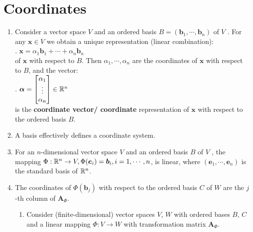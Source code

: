 \section{Coordinates}

\begin{enumerate}
    \item Consider a vector space $V$ and an ordered basis $B = (\bm{b}_1, \cdots , \bm{b}_n)$ of $V$ .
    For any $\bm{x} \in V$ we obtain a unique representation (linear combination):
    \hfill \cite{mfml/book/mml/Deisenroth-Faisal-Ong}
    \\
    .\hfill
    $
        \bm{x} = \alpha_1 \bm{b}_1 + \cdots + \alpha_n \bm{b}_n
    $
    \hfill \cite{mfml/book/mml/Deisenroth-Faisal-Ong}
    \\
    of $\bm{x}$ with respect to $B$.
    Then $\alpha_1, \cdots , \alpha_n$ are the coordinates of $\bm{x}$ with respect to $B$, and the vector:
    \hfill \cite{mfml/book/mml/Deisenroth-Faisal-Ong}
    \\
    .\hfill
    $
        \bm{\alpha} = \begin{bmatrix}
            \alpha_1 \\
            \vdots \\
            \alpha_n
        \end{bmatrix}
        \in \mathbb{R}^n
    $
    \hfill \cite{mfml/book/mml/Deisenroth-Faisal-Ong}
    \\
    is the \textbf{coordinate vector/ coordinate} representation of $\bm{x}$ with respect to the ordered basis $B$.
    \hfill \cite{mfml/book/mml/Deisenroth-Faisal-Ong}

    \item A basis effectively defines a coordinate system.
    \hfill \cite{mfml/book/mml/Deisenroth-Faisal-Ong}

    \item For an $n$-dimensional vector space $V$ and an ordered basis $B$ of $V$ , the mapping $\Phi : \mathbb{R}^n \to V , \Phi(\bm{e}_i) = \bm{b}_i , i = 1, \cdots , n$, is linear, where $(\bm{e}_1, \cdots , \bm{e}_n)$ is the standard basis of $\mathbb{R}^n$.
    \hfill \cite{mfml/book/mml/Deisenroth-Faisal-Ong}

    \item The coordinates of $\Phi(\bm{b}_j )$ with respect to the ordered basis $C$ of $W$ are the $j$-th column of $\bm{A}_\Phi$.
    \hfill \cite{mfml/book/mml/Deisenroth-Faisal-Ong}
    \hfill \cite{mfml/book/mml/Deisenroth-Faisal-Ong}
    \begin{enumerate}
        \item Consider (finite-dimensional) vector spaces $V$, $W$ with ordered bases $B$, $C$ and a linear mapping $\Phi : V \to W$ with transformation matrix $\bm{A}_\Phi$.
        \hfill \cite{mfml/book/mml/Deisenroth-Faisal-Ong}


\end{enumerate}
\end{enumerate}
